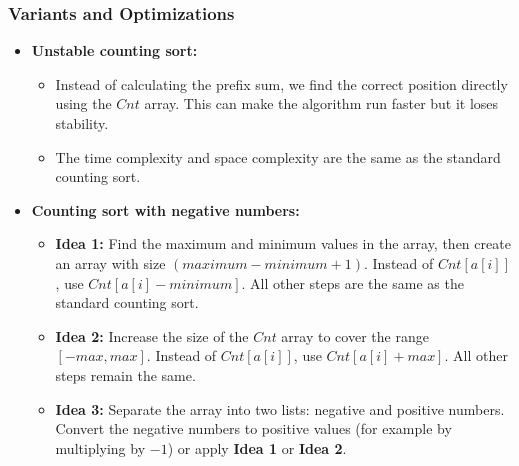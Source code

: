     \subsubsection{Variants and Optimizations}
        \begin{itemize}
        \item \textbf{Unstable counting sort\cite{bajpai2014ecounting}:}
            \begin{itemize}
                \item Instead of calculating the prefix sum, we find the correct position directly using the $Cnt$ array. This can make the algorithm run faster but it loses stability.
                \item The time complexity and space complexity are the same as the standard counting sort.
            \end{itemize}
        \end{itemize}
        \begin{itemize}
        \item \textbf{Counting sort with negative numbers\cite{stackoverflow_countingsort_negative}:}
            \begin{itemize}
                \item \textbf{Idea 1:} Find the maximum and minimum values in the array, then create an array with size $(maximum - minimum + 1)$. Instead of $Cnt[a[i]]$, use $Cnt[a[i] - minimum]$. All other steps are the same as the standard counting sort.
                \item \textbf{Idea 2:} Increase the size of the $Cnt$ array to cover the range $[-max, max]$. Instead of $Cnt[a[i]]$, use $Cnt[a[i] + max]$. All other steps remain the same.
                \item \textbf{Idea 3\cite{saiana2018parallelcounting}:} Separate the array into two lists: negative and positive numbers. Convert the negative numbers to positive values (for example by multiplying by $-1$) or apply \textbf{Idea 1} or \textbf{Idea 2}.
            \end{itemize}
        \end{itemize}

